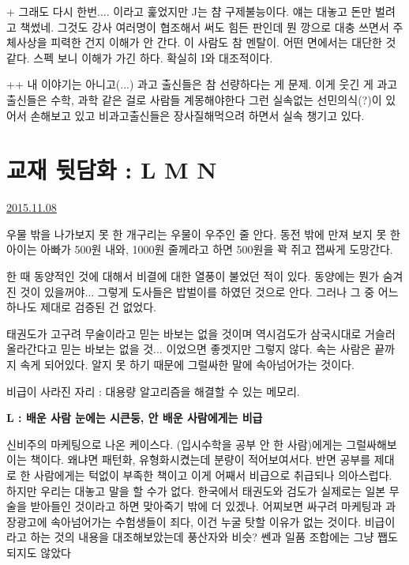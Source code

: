 +
그래도 다시 한번.... 이라고 훑었지만   J는 챰 구제불능이다. 얘는 대놓고 돈만 벌려고 책썼네.
그것도 강사 여러명이 협조해서 써도 힘든 판인데 뭔 깡으로 대충 쓰면서 주체사상을 피력한 건지 이해가 안 간다.
이 사람도 참 멘탈이. 어떤 면에서는 대단한 것 같다.
스펙 보니 이해가 가긴 하다. 확실히 I와 대조적이다.
\vspace{5mm}

++
내 이야기는 아니고(...)
과고 출신들은 참 선량하다는 게 문제.
이게 웃긴 게 과고 출신들은 수학, 과학 같은 걸로 사람들 계몽해야한다 그런 실속없는 선민의식(?)이 있어서 손해보고 있고
비과고출신들은 장사질해먹으려 하면서 실속 챙기고 있다.
\vspace{5mm}












\section{교재 뒷담화 : L M N}
\href{https://www.kockoc.com/Apoc/470245}{2015.11.08}

\vspace{5mm}

우물 밖을 나가보지 못 한 개구리는 우물이 우주인 줄 안다.
동전 밖에 만져 보지 못 한 아이는 아빠가 500원 내와, 1000원 줄께라고 하면 500원을 꽉 쥐고 잽싸게 도망간다.
\vspace{5mm}

한 때 동양적인 것에 대해서 비결에 대한 열풍이 불었던 적이 있다.
동양에는 뭔가 숨겨진 것이 있을꺼야... 그렇게 도사들은 밥벌이를 하였던 것으로 안다.
그러나 그 중 어느 하나도 제대로 검증된 건 없었다.
\vspace{5mm}

태권도가 고구려 무술이라고 믿는 바보는 없을 것이며
역시검도가 삼국시대로 거슬러 올라간다고 믿는 바보는 없을 것... 이었으면 좋겟지만 그렇지 않다.
속는 사람은 끝까지 속게 되어있다. 알지 못 하기 때문에 그럴싸한 말에 속아넘어가는 것이다.
\vspace{5mm}

비급이 사라진 자리 : 대용량 알고리즘을 해결할 수 있는 메모리.
\vspace{5mm}

\textbf{L : 배운 사람 눈에는 시큰둥, 안 배운 사람에게는 비급}
\vspace{5mm}

신비주의 마케팅으로 나온 케이스다.
(입시수학을 공부 안 한 사람)에게는 그럴싸해보이는 책이다. 왜냐면 패턴화, 유형화시켰는데 분량이 적어보여서다.
반면 공부를 제대로 한 사람에게는 턱없이 부족한 책이고 이게 어째서 비급으로 취급되나 의아스럽다.
하지만 우리는 대놓고 말을 할 수가 없다. 한국에서 태권도와 검도가 실제로는 일본 무술을 받아들인 것이라고 하면 맞아죽기 밖에 더 있겠나.
어찌보면 싸구려 마케팅과 과장광고에 속아넘어가는 수험생들이 죄다, 이건 누굴 탓할 이유가 없는 것이다.
비급이라고 하는 것의 내용을 대조해보았는데 풍산자와 비슷? 쎈과 일품 조합에는 그냥 쨉도 되지도 않았다
\vspace{5mm}

